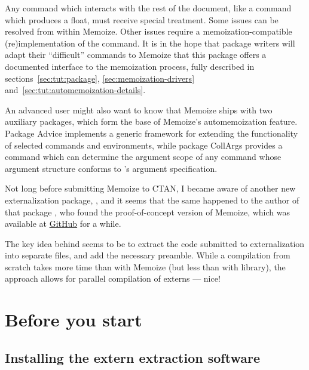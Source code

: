 \documentclass[a4paper,11pt]{article}
\begin{document}
  
\begin{tcolorbox}[
    title={\introboxtitle{How} can I make my command (auto)memoizable?},
  ]
  Any command which interacts with the rest of the document, like a command
  which produces a float, must receive special treatment.  Some issues can be
  resolved from within Memoize.  Other issues require a memoization-compatible
  (re)implementation of the command.  It is in the hope that package writers
  will adapt their ``difficult'' commands to Memoize that this package offers a
  documented interface to the memoization process, fully described in
  sections~\ref{sec:tut:package}, \ref{sec:memoization-drivers}
  and~\ref{sec:tut:automemoization-details}.

  An advanced user might also want to know that Memoize ships with two
  auxiliary packages, which form the base of Memoize's automemoization feature.
  Package Advice implements a generic framework for extending the functionality
  of selected commands and environments, while package CollArgs provides a
  command which can determine the argument scope of any command whose argument
  structure conforms to 's argument specification.
\end{tcolorbox}

\begin{tcolorbox}[
    title={\introboxtitle{What else} is out there?},
  ]
  Not long before submitting Memoize to CTAN, I became aware of another new
  externalization package, , and it seems that the same
  happened to the author of that package \Smiley, who found the
  proof-of-concept version of Memoize, which was available
  at \href{https://github.com/sasozivanovic/memoize}{GitHub} for a while.
  
  The key idea behind  seems to be to extract the code
  submitted to externalization into separate files, and add the necessary
  preamble.  While a compilation from scratch takes more time than with Memoize
  (but less than with \TikZ library), the approach allows for parallel
  compilation of externs --- nice!
\end{tcolorbox}

\newpage
\tableofcontents


\section{Before you start}
\label{sec:setup}

\subsection{Installing the extern extraction software}
\label{sec:install}
\end{document}
